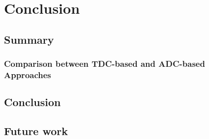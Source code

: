 \chapter{Conclusion}

\section{Summary}
\subsection{Comparison between TDC-based and ADC-based Approaches}
\section{Conclusion}
\section{Future work}